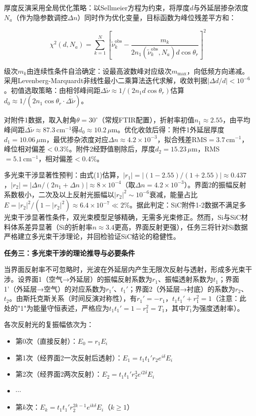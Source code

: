\documentclass{mcmthesis}
\begin{document}
厚度反演采用全局优化策略：以Sellmeier方程为约束，将厚度$d$与外延层掺杂浓度$N_a$（作为隐参数调控$\Delta n$）同时作为优化变量，目标函数为峰位残差平方和：

$$\chi^2(d,N_a) = \sum_{k=1}^{N}\left[\tilde{\nu}_k^{\mathrm{obs}} - \frac{m_k}{2n_1(\tilde{\nu}_k^{\mathrm{obs}},N_a)d\cos\theta_r}\right]^2 \tag{10}$$

级次$m_k$由连续性条件自洽确定：设最高波数峰对应级次$m_{\max}$，向低频方向递减。采用Levenberg-Marquardt非线性最小二乘算法迭代求解，收敛判据$|\Delta d/d|<10^{-6}$。初值选取策略：由相邻峰间距$\Delta\tilde{\nu}\approx 1/(2n_1d\cos\theta_r)$估算$d_0\approx 1/(2n_1\cos\theta_r\cdot\overline{\Delta\tilde{\nu}})$。

对附件1数据，取入射角$\theta=30^{\circ}$（常规FTIR配置），折射率初值$n_1\approx 2.55$，由平均峰间距$\overline{\Delta\tilde{\nu}}\approx 87.3\,\mathrm{cm}^{-1}$得$d_0\approx 10.2\,\mu\mathrm{m}$。优化收敛后得：附件1外延层厚度$d_1=10.06\,\mu\mathrm{m}$，最优掺杂浓度对应$\Delta n\approx 4.2\times10^{-3}$，拟合残差RMS$=3.7\,\mathrm{cm}^{-1}$，峰位相对偏差$<0.3\%$。附件2经野值剔除后，厚度$d_2=15.23\,\mu\mathrm{m}$，RMS$=5.1\,\mathrm{cm}^{-1}$，相对偏差$<0.4\%$。

多光束干涉显著性预判：由式(1)估算，$|r_1|=|(1-2.55)/(1+2.55)|\approx 0.437$，$|r_2|=|\Delta n/(2n_1+\Delta n)|\approx 8\times10^{-4}$（取$\Delta n=4.2\times10^{-3}$）。界面2的振幅反射系数极小，二次及以上反射光振幅以$|r_2|^2\sim 10^{-6}$衰减，能量占比$E=|r_2|^2/(1-|r_2|^2)\approx 6.4\times 10^{-7}\ll 2\%$。据此判定：SiC附件1-2数据不满足多光束干涉显著性条件，双光束模型足够精确，无需多光束修正。然而，Si与SiC材料体系差异显著（Si的折射率$n\approx 3.4$更高，界面反射更强），任务三将针对Si数据严格建立多光束干涉理论，并回检验证SiC结论的稳健性。

\textbf{任务三：多光束干涉的理论推导与必要条件}

当界面反射率不可忽略时，光波在外延层内产生无限次反射与透射，形成多光束干涉。设界面1（空气→外延层）的振幅反射系数为$r_1$、振幅透射系数为$t_1$；界面1'（外延层→空气）的对应系数为$r_1'$、$t_1'$；界面2（外延层→衬底）的系数为$r_2$、$t_2$。由斯托克斯关系（时间反演对称性），有$r_1'=-r_1$，$t_1t_1'+r_1^2=1$（注意：此处的"1"为能量守恒表述，严格应为$t_1t_1'=1-r_1^2=T_1$，其中$T_1$为强度透射率）。

各次反射光的复振幅依次为：
\begin{itemize}
    \item 第0次（直接反射）：$E_0 = r_1 E_i$
    \item 第1次（经界面2一次反射后透射）：$E_1 = t_1 t_1' r_2 e^{i\delta} E_i$
    \item 第2次（经界面2两次反射）：$E_2 = t_1 t_1' r_2^3 e^{i2\delta} E_i$
    \item $\cdots$
    \item 第$k$次：$E_k = t_1 t_1' r_2^{2k-1} e^{ik\delta} E_i$（$k\geq 1$）
\end{itemize}
\end{document}

